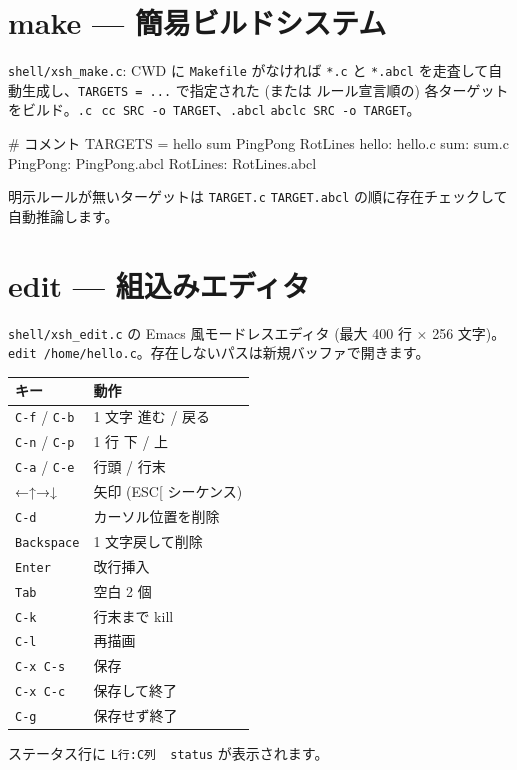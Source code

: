 \documentclass[a4paper,11pt]{ltjsarticle}
\begin{document}
\section{make --- 簡易ビルドシステム}
\verb|shell/xsh_make.c|: CWD に \verb|Makefile| がなければ \verb|*.c| と
\verb|*.abcl| を走査して自動生成し、\verb|TARGETS = ...| で指定された (または
ルール宣言順の) 各ターゲットをビルド。\verb|.c|\,\textrightarrow{}\,%
\verb|cc SRC -o TARGET|、\verb|.abcl|\,\textrightarrow{}\,\verb|abclc SRC -o TARGET|。
\begin{code}
# コメント
TARGETS = hello sum PingPong RotLines
hello:    hello.c
sum:      sum.c
PingPong: PingPong.abcl
RotLines: RotLines.abcl
\end{code}
明示ルールが無いターゲットは \verb|TARGET.c| \textrightarrow{} \verb|TARGET.abcl|
の順に存在チェックして自動推論します。

\section{edit --- 組込みエディタ}
\verb|shell/xsh_edit.c| の Emacs 風モードレスエディタ (最大 400 行 × 256 文字)。
\verb|edit /home/hello.c|。存在しないパスは新規バッファで開きます。
\begin{center}\footnotesize
\begin{tabular}{@{}l l@{}}
\toprule \textbf{キー} & \textbf{動作}\\ \midrule
\verb|C-f| / \verb|C-b| & 1 文字 進む / 戻る\\
\verb|C-n| / \verb|C-p| & 1 行 下 / 上\\
\verb|C-a| / \verb|C-e| & 行頭 / 行末\\
←↑→↓ & 矢印 (ESC[ シーケンス)\\
\verb|C-d| & カーソル位置を削除\\
\verb|Backspace| & 1 文字戻して削除\\
\verb|Enter| & 改行挿入\\
\verb|Tab| & 空白 2 個\\
\verb|C-k| & 行末まで kill\\
\verb|C-l| & 再描画\\
\verb|C-x C-s| & 保存\\
\verb|C-x C-c| & 保存して終了\\
\verb|C-g| & 保存せず終了\\
\bottomrule
\end{tabular}
\end{center}
ステータス行に \verb|L行:C列  status| が表示されます。
\end{document}
